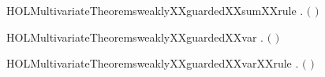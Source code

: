\newcommand{\HOLMultivariateTheoremsweaklyXXguardedXXsumXXrewrite}{\UseVerbatim{HOLMultivariateTheoremsweaklyXXguardedXXsumXXrewrite}}
\begin{SaveVerbatim}{HOLMultivariateTheoremsweaklyXXguardedXXsumXXrule}
\HOLTokenTurnstile{} \HOLSymConst{\HOLTokenForall{}}  .
          \HOLSymConst{\HOLTokenConj{}}    \HOLSymConst{\HOLTokenImp{}}
         \ensuremath{(} \HOLSymConst{\ensuremath{+}} \ensuremath{)}
\end{SaveVerbatim}
\newcommand{\HOLMultivariateTheoremsweaklyXXguardedXXsumXXrule}{\UseVerbatim{HOLMultivariateTheoremsweaklyXXguardedXXsumXXrule}}
\begin{SaveVerbatim}{HOLMultivariateTheoremsweaklyXXguardedXXvar}
\HOLTokenTurnstile{} \HOLSymConst{\HOLTokenForall{}} .   \ensuremath{(} \ensuremath{)} \HOLSymConst{\HOLTokenImp{}} \HOLSymConst{\HOLTokenNeg{}}  
\end{SaveVerbatim}
\newcommand{\HOLMultivariateTheoremsweaklyXXguardedXXvar}{\UseVerbatim{HOLMultivariateTheoremsweaklyXXguardedXXvar}}
\begin{SaveVerbatim}{HOLMultivariateTheoremsweaklyXXguardedXXvarXXrule}
\HOLTokenTurnstile{} \HOLSymConst{\HOLTokenForall{}} . \HOLSymConst{\HOLTokenNeg{}}   \HOLSymConst{\HOLTokenImp{}}   \ensuremath{(} \ensuremath{)}
\end{SaveVerbatim}
\newcommand{\HOLMultivariateTheoremsweaklyXXguardedXXvarXXrule}{\UseVerbatim{HOLMultivariateTheoremsweaklyXXguardedXXvarXXrule}}
